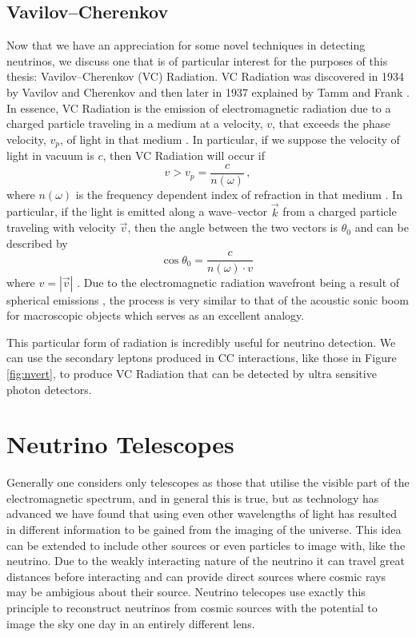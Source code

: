 \subsection{Vavilov--Cherenkov}

Now that we have an appreciation for some novel techniques in detecting neutrinos, we discuss one that is of particular interest for the purposes of this thesis: Vavilov--Cherenkov (VC) Radiation. VC Radiation was discovered in 1934 by Vavilov \cite{vav_og} and Cherenkov \cite{cher_og} and then later in 1937 explained by Tamm and Frank \cite{tamm}. In essence, VC Radiation is the emission of electromagnetic radiation due to a charged particle traveling in a medium at a velocity, $v$, that exceeds the phase velocity, $v_{p}$, of light in that medium \cite{ginz}. In particular, if we suppose the velocity of light in vacuum is $c$, then VC Radiation will occur if
\begin{equation}
  v > v_{p} = \frac{c}{n(\omega)}\, ,
\end{equation}
where $n(\omega)$ is the frequency dependent index of refraction in that medium \cite{ginz}. In particular, if the light is emitted along a wave--vector $\vec{k}$ from a charged particle traveling with velocity $\vec{v}$, then the angle between the two vectors is $\theta_{0}$ and can be described by
\begin{equation}\label{fig:cher_angle}
  \cos\theta_{0} = \frac{c}{n(\omega)\cdot v}\,
\end{equation}
where $v = |\vec{v}|$ \cite{ginz}. Due to the electromagnetic radiation wavefront being a result of spherical emissions \cite{ginz}, the process is very similar to that of the acoustic sonic boom for macroscopic objects \cite{ginz} which serves as an excellent analogy.

This particular form of radiation is incredibly useful for neutrino detection. We can use the secondary leptons produced in CC interactions, like those in Figure \ref{fig:nvert}, to produce VC Radiation that can be detected by ultra sensitive photon detectors. 

\section{Neutrino Telescopes}

Generally one considers only telescopes as those that utilise the visible part of the electromagnetic spectrum, and in general this is true, but as technology has advanced we have found that using even other wavelengths of light has resulted in different information to be gained from the imaging of the universe. This idea can be extended to include other sources or even particles to image with, like the neutrino. Due to the weakly interacting nature of the neutrino it can travel great distances before interacting and can provide direct sources where cosmic rays may be ambigious about their source. Neutrino telecopes use exactly this principle to reconstruct neutrinos from cosmic sources with the potential to image the sky one day in an entirely different lens.

